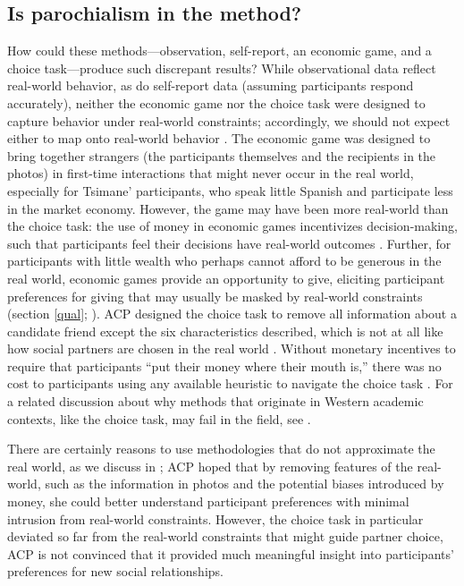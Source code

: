 \documentclass[bibauthoryear]{aa}
\begin{document}
	\subsection{Is parochialism in the method?}
How could these methods---observation, self-report, an economic game, and a choice task---produce such discrepant results? While observational data reflect real-world behavior, as do self-report data (assuming participants respond accurately), neither the economic game nor the choice task were designed to capture behavior under real-world constraints; accordingly, we should not expect either to map onto real-world behavior  \citep{Pisor2020, gurven2008collective}. The economic game was designed to bring together strangers (the participants themselves and the recipients in the photos) in first-time interactions that might never occur in the real world, especially for Tsimane' participants, who speak little Spanish and participate less in the market economy. However, the game may have been more real-world than the choice task: the use of money in economic games incentivizes decision-making, such that participants feel their decisions have real-world outcomes \citep{guala2005methodology}. Further, for participants with little wealth who perhaps cannot afford to be generous in the real world, economic games provide an opportunity to give, eliciting participant preferences for giving that may usually be masked by real-world constraints (section \ref{qual}; \citep{Pisor2020}). ACP designed the choice task to remove all information about a candidate friend except the six characteristics described, which is not at all like how social partners are chosen in the real world \citep[see][for a relevant review]{barclay2013strategies}. Without monetary incentives to require that participants ``put their money where their mouth is,'' there was no cost to participants using any available  heuristic to navigate the choice task \citep{Pisor2020, xygalatasreligious}. For a related discussion about why methods that originate in Western academic contexts, like the choice task, may fail in the field, see \citet{hruschka2018learning}.

There are certainly reasons to use methodologies that do not approximate the real world, as we discuss in \citet{Pisor2020}; ACP hoped that by removing features of the real-world, such as the information in photos and the potential biases introduced by money, she could better understand participant preferences with minimal intrusion from real-world constraints. However, the choice task in particular deviated so far from the real-world constraints that might guide partner choice, ACP is not convinced that it provided much meaningful insight into participants' preferences for new social relationships.
\end{document}
